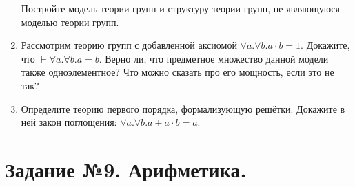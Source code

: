\documentclass[10pt,a4paper,oneside]{article}
\begin{document}
\begin{enumerate}
Постройте модель теории групп и структуру теории групп, не являющуюся моделью теории групп.

\item Рассмотрим теорию групп с добавленной аксиомой $\forall a.\forall b.a\cdot b = 1$. 
Докажите, что $\vdash \forall a.\forall b.a = b$. Верно ли, что предметное множество данной модели также одноэлементное?
Что можно сказать про его мощность, если это не так?

\item Определите теорию первого порядка, формализующую решётки. Докажите в ней закон поглощения: $\forall a.\forall b.a + a \cdot b = a$.

\end{enumerate}

\section*{Задание №9. Арифметика.}
\end{document}
